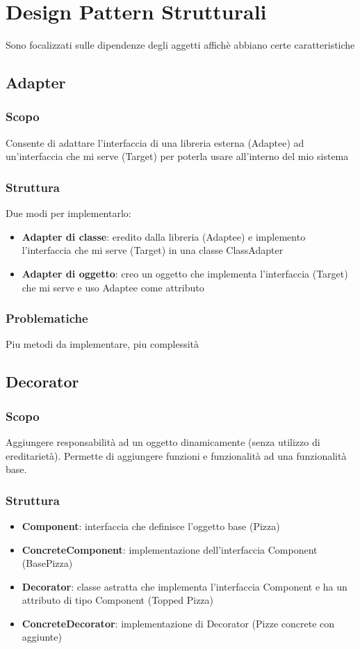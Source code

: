 \section{Design Pattern Strutturali}
Sono focalizzati sulle dipendenze degli aggetti affichè abbiano certe
caratteristiche

\subsection{Adapter}
\subsubsection{Scopo}
Consente di adattare l'interfaccia di una libreria esterna (Adaptee) ad
un'interfaccia che mi serve (Target) per poterla usare all'interno del mio
sistema
\subsubsection{Struttura}
Due modi per implementarlo:
\begin{itemize}
    \item \textbf{Adapter di classe}: eredito dalla libreria (Adaptee) e implemento l'interfaccia che mi serve (Target)  in una classe ClassAdapter
    \item \textbf{Adapter di oggetto}: creo un oggetto che implementa l'interfaccia (Target) che mi serve e uso Adaptee come attributo
\end{itemize}
\subsubsection{Problematiche}
Piu metodi da implementare, piu complessità

\subsection{Decorator}
\subsubsection{Scopo}
Aggiungere responsabilità ad un oggetto dinamicamente (senza utilizzo di
ereditarietà). Permette di aggiungere funzioni e funzionalità ad una
funzionalità base.
\subsubsection{Struttura}
\begin{itemize}
    \item \textbf{Component}: interfaccia che definisce l'oggetto base (Pizza)
    \item \textbf{ConcreteComponent}: implementazione dell'interfaccia Component (BasePizza)
    \item \textbf{Decorator}: classe astratta che implementa l'interfaccia Component e ha un attributo di tipo Component (Topped Pizza)
    \item \textbf{ConcreteDecorator}: implementazione di Decorator (Pizze concrete con aggiunte)
\end{itemize}
